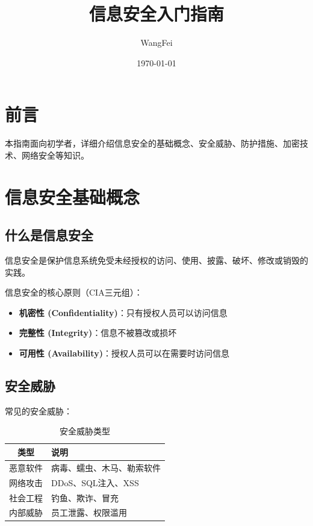 \documentclass[12pt,UTF8]{ctexbook}
\title{\heiti\zihao{0} 信息安全入门指南}
\author{WangFei}
\date{\today}
\begin{document}
\maketitle
\tableofcontents

\frontmatter
\chapter{前言}

本指南面向初学者，详细介绍信息安全的基础概念、安全威胁、防护措施、加密技术、网络安全等知识。

\mainmatter

\chapter{信息安全基础概念}
\label{chap:security_basics}

\section{什么是信息安全}
\label{sec:what_is_security}

信息安全是保护信息系统免受未经授权的访问、使用、披露、破坏、修改或销毁的实践。

信息安全的核心原则（CIA三元组）：
\begin{itemize}
    \item \textbf{机密性 (Confidentiality)}：只有授权人员可以访问信息
    \item \textbf{完整性 (Integrity)}：信息不被篡改或损坏
    \item \textbf{可用性 (Availability)}：授权人员可以在需要时访问信息
\end{itemize}

\section{安全威胁}
\label{sec:security_threats}

常见的安全威胁：
\begin{table}[htbp]
    \centering
    \caption{安全威胁类型}
    \begin{tabular}{|c|p{8cm}|}
        \hline
        \textbf{类型} & \textbf{说明} \\
        \hline
        恶意软件 & 病毒、蠕虫、木马、勒索软件 \\
        \hline
        网络攻击 & DDoS、SQL注入、XSS \\
        \hline
        社会工程 & 钓鱼、欺诈、冒充 \\
        \hline
        内部威胁 & 员工泄露、权限滥用 \\
        \hline
    \end{tabular}
\end{table}
\end{document}
